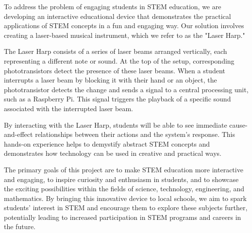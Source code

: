 To address the problem of engaging students in STEM education, we are developing an interactive educational device that demonstrates the practical applications of STEM concepts in a fun and engaging way. Our solution involves creating a laser-based musical instrument, which we refer to as the "Laser Harp."

The Laser Harp consists of a series of laser beams arranged vertically, each representing a different note or sound. At the top of the setup, corresponding phototransistors detect the presence of these laser beams. When a student interrupts a laser beam by blocking it with their hand or an object, the phototransistor detects the change and sends a signal to a central processing unit, such as a Raspberry Pi. This signal triggers the playback of a specific sound associated with the interrupted laser beam.

By interacting with the Laser Harp, students will be able to see immediate cause-and-effect relationships between their actions and the system's response. This hands-on experience helps to demystify abstract STEM concepts and demonstrates how technology can be used in creative and practical ways.

The primary goals of this project are to make STEM education more interactive and engaging, to inspire curiosity and enthusiasm in students, and to showcase the exciting possibilities within the fields of science, technology, engineering, and mathematics. By bringing this innovative device to local schools, we aim to spark students' interest in STEM and encourage them to explore these subjects further, potentially leading to increased participation in STEM programs and careers in the future.
